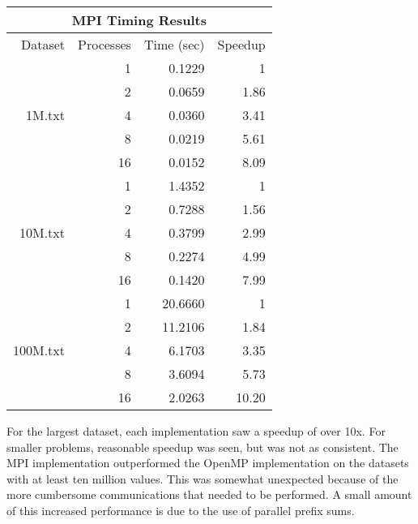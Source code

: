 \documentclass[a4paper]{article}
\begin{document}
\begin{center}
  \begin{tabular}{| r | r r r |}
    \hline
    \multicolumn{4}{|c|}{MPI Timing Results} \\
    \hline
    Dataset & Processes & Time (sec) & Speedup\\
    \hline
    \multirow{5}{4em}{1M.txt} & 1 & 0.1229 & 1\\
    & 2 & 0.0659 & 1.86 \\
    & 4 & 0.0360 & 3.41 \\
    & 8 & 0.0219 & 5.61 \\
    & 16 & 0.0152 & 8.09 \\
    \hline
    \multirow{5}{4em}{10M.txt} & 1 & 1.4352 & 1 \\
    & 2 & 0.7288 & 1.56 \\
    & 4 & 0.3799 & 2.99 \\
    & 8 & 0.2274 & 4.99 \\
    & 16 & 0.1420 & 7.99 \\
    \hline
    \multirow{5}{4em}{100M.txt} & 1 & 20.6660 & 1 \\
    & 2 & 11.2106 & 1.84 \\
    & 4 & 6.1703 & 3.35 \\
    & 8 & 3.6094 & 5.73 \\
    & 16 & 2.0263 & 10.20 \\
    \hline
  \end{tabular}
\end{center}

For the largest dataset, each implementation saw a speedup of over 10x. For smaller problems, reasonable speedup was seen, but was not as consistent.
The MPI implementation outperformed the OpenMP implementation on the datasets with at least ten million values. This was somewhat unexpected because
of the more cumbersome communications that needed to be performed. A small amount of this increased performance is due to the use of parallel prefix
sums.
\end{document}
